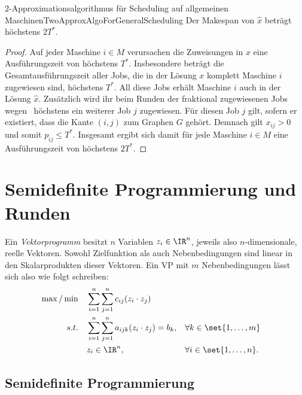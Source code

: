 \documentclass[language=ngerman,algolist]{TemplateLecture}
\begin{document}
\begin{thm}{$2$-Approximationsalgorithmus für Scheduling auf allgemeinen Maschinen}{TwoApproxAlgoForGeneralScheduling}
    Der Makespan von $\hat{x}$ beträgt höchstens $2T^*$.
\end{thm}

\begin{proof}
    Auf jeder Maschine $i \in M$ verursachen die Zuweisungen in $x$ eine Ausführungszeit von höchstens $T^*$. Insbesondere beträgt die Gesamtausführungszeit aller Jobs, die in der Lösung $x$ komplett Maschine $i$ zugewiesen sind, höchstens $T^*$. All diese Jobs erhält Maschine $i$ auch in der Lösung $\hat{x}$. Zusätzlich wird ihr beim Runden der fraktional zugewiesenen Jobs wegen~ höchstens ein weiterer Job $j$ zugewiesen. Für diesen Job $j$ gilt, sofern er existiert, dass die Kante $(i, j)$ zum Graphen $G$ gehört. Demnach gilt $x_{ij} > 0$ und somit $p_{ij} \leq T^*$. Insgesamt ergibt sich damit für jede Maschine $i \in M$ eine Ausführungszeit von höchstens $2T^*$.
\end{proof}



\chapter{Semidefinite Programmierung und Runden}

Ein \emph{Vektorprogramm} besitzt $n$ Variablen $z_i \in \IR^n$, jeweils also $n$-dimensionale, reelle Vektoren. Sowohl Zielfunktion als auch Nebenbedingungen sind linear in den Skalarprodukten dieser Vektoren. Ein VP mit $m$ Nebenbedingungen lässt sich also wie folgt schreiben:
\begin{equation}
    \begin{aligned}
        \max/\min \quad & \sum_{i = 1}^n \sum_{j = 1}^n c_{ij} (z_i \cdot z_j) \\
        s.t. \quad & \sum_{i = 1}^n \sum_{j = 1}^n a_{ijk}(z_i \cdot z_j) = b_k, && \forall k \in \set{1,\ldots,m} \\
        & z_i \in \IR^n, && \forall i \in \set{1,\ldots,n}.
    \end{aligned}\label{eq:vectorProgram}
\end{equation}


\section{Semidefinite Programmierung}
\end{document}
